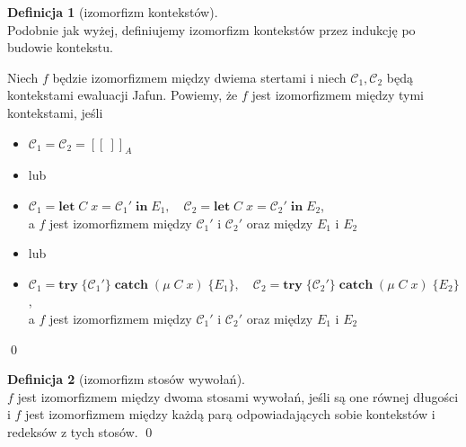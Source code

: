 \documentclass[]{pracamgr}
\renewcommand \| {\hspace{0.75em} | \hspace{0.75em} }
\renewcommand \[ {[\![}
\renewcommand \] {]\!]}
\theoremstyle{definition}
\newtheorem{definition}{Definicja}[section]
\newcommand{\mmod}{\mu\xspace}
\newcommand{\jlet}{\mathbf{let}\xspace}
\newcommand{\jin}{\mathbf{in}\xspace}
\newcommand{\jtry}{\mathbf{try}\xspace}
\newcommand{\jcatch}{\mathbf{catch}\xspace}
\newcommand{\letin}[4]{\jlet\; #1\; #2 = #3\; \jin\; #4\xspace}
\newcommand{\tcatch}[4]{\jtry\; \boldsymbol{\{}#1\boldsymbol{\}}\; \jcatch\; (#2\; #3)\; \boldsymbol{\{}#4\boldsymbol{\}}\xspace}
\newcommand{\ctxt}{\mathcal{C}\xspace}
\begin{document}
\begin{definition}[izomorfizm kontekstów] {\ } \\
Podobnie jak wyżej, definiujemy izomorfizm kontekstów przez indukcję po budowie kontekstu.

Niech $f$ będzie izomorfizmem między dwiema stertami i niech $\ctxt_1, \ctxt_2$ będą kontekstami ewaluacji Jafun.
Powiemy, że $f$ jest izomorfizmem między tymi kontekstami, jeśli
\begin{itemize}
 \item $\ctxt_1 = \ctxt_2 =  \[ ~\]_A$
 \item[] lub
 \item $\ctxt_1 = \letin{C}{x}{\ctxt_1'}{E_1}, \quad
        \ctxt_2 = \letin{C}{x}{\ctxt_2'}{E_2}$, \\
    a $f$ jest izomorfizmem między $\ctxt_1'$ i $\ctxt_2'$ oraz między $E_1$ i $E_2$
 \item[] lub
 \item $\ctxt_1 = \tcatch{\ctxt_1'}{\mmod\; C}{x}{E_1},\quad
        \ctxt_2 = \tcatch{\ctxt_2'}{\mmod\; C}{x}{E_2}$, \\
    a $f$ jest izomorfizmem między $\ctxt_1'$ i $\ctxt_2'$ oraz między $E_1$ i $E_2$
\end{itemize}
\qed
\end{definition}

\begin{definition}[izomorfizm stosów wywołań] {\ } \\
$f$ jest izomorfizmem między dwoma stosami wywołań, jeśli są one równej długości
i $f$ jest izomorfizmem między każdą parą odpowiadających sobie kontekstów i redeksów z tych stosów.
\qed
\end{definition}

\newcommand{\hrest}{h^{rest}}
\newcommand{\hbase}{h^{base}}
\end{document}
